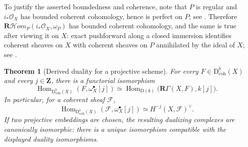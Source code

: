 \documentclass[11pt,a4paper]{article}
\newtheorem{theorem}{Theorem}[section]
\theoremstyle{definition}
\theoremstyle{remark}
\newcommand{\OO}{\mathcal O}
\newcommand{\FF}{\mathcal F}
\newcommand{\Hom}{\operatorname{Hom}}
\newcommand{\RshHom}{\mathbf R\!\mathcal H\!om}
\newcommand{\RGamma}{\mathbf R\Gamma}
\newcommand{\D}{\mathrm D}
\newcommand{\Dbcoh}{\mathrm D^b_{\mathrm{coh}}}
\newcommand{\dual}{^{\vee}}
\begin{document}
To justify the asserted boundedness and coherence, note that $P$ is regular and
$i_*\OO_X$ has bounded coherent cohomology, hence is perfect on $P$; see
\cite[Tag 0FDC]{Stacks}. Therefore
$\RshHom_P(i_*\OO_X,\omega_P)$ has bounded coherent cohomology, and the same
is true after viewing it on $X$: exact pushforward along a closed immersion
identifies coherent sheaves on $X$ with coherent sheaves on $P$ annihilated
by the ideal of $X$; see \cite[Tag 01XY]{Stacks}.

\begin{theorem}[Derived duality for a projective scheme]
\label{thm:derived-duality-projective}
For every $F\in\Dbcoh(X)$ and every $j\in\mathbf Z$, there is a functorial
isomorphism
\begin{equation}\label{eq:derived-duality-projective}
  \Hom_{\Dbcoh(X)}(F,\omega_X^\bullet[j])
  \simeq
  \Hom_{\D(k)}\bigl(\RGamma(X,F),k[j]\bigr).
\end{equation}
In particular, for a coherent sheaf $\FF$,
\[
  \Hom_{\Dbcoh(X)}(\FF,\omega_X^\bullet[j])
  \simeq H^{-j}(X,\FF)\dual.
\]
If two projective embeddings are chosen, the resulting dualizing complexes
are canonically isomorphic: there is a unique isomorphism compatible with
the displayed duality isomorphisms.
\end{theorem}
\end{document}
